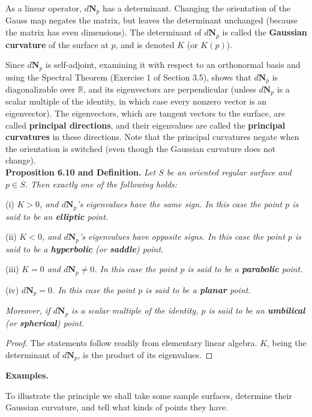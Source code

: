 \documentclass[leqno]{book}
\begin{document}
\noindent As a linear operator, $d\mathbf N_p$ has a determinant.  Changing the orientation of the Gauss map negates the matrix, but leaves the determinant unchanged (because the matrix has even dimensions).  The determinant of $d\mathbf N_p$ is called the \textbf{Gaussian curvature} of the surface at $p$, and is denoted $K$ (or $K(p)$).

Since $d\mathbf N_p$ is self-adjoint, examining it with respect to an orthonormal basis and using the Spectral Theorem (Exercise 1 of Section 3.5), shows that $d\mathbf N_p$ is diagonalizable over $\mathbb R$, and its eigenvectors are perpendicular (unless $d\mathbf N_p$ is a scalar multiple of the identity, in which case every nonzero vector is an eigenvector).  The eigenvectors, which are tangent vectors to the surface, are called \textbf{principal directions}, and their eigenvalues are called the \textbf{principal curvatures} in these directions.  Note that the principal curvatures negate when the orientation is switched (even though the Gaussian curvature does not change).\\

\noindent\textbf{Proposition 6.10 and Definition.} \emph{Let $S$ be an oriented regular surface and $p\in S$.  Then exactly one of the following holds:}

(i) \emph{$K>0$, and $d\mathbf N_p$'s eigenvalues have the same sign.  In this case the point $p$ is said to be an \textbf{elliptic} point.}

(ii) \emph{$K<0$, and $d\mathbf N_p$'s eigenvalues have opposite signs.  In this case the point $p$ is said to be a \textbf{hyperbolic} (or \textbf{saddle}) point.}

(iii) \emph{$K=0$ and $d\mathbf N_p\ne 0$.  In this case the point $p$ is said to be a \textbf{parabolic} point.}

(iv) \emph{$d\mathbf N_p=0$.  In this case the point $p$ is said to be a \textbf{planar} point.}

\emph{Moreover, if $d\mathbf N_p$ is a scalar multiple of the identity, $p$ is said to be an \textbf{umbilical} (or \textbf{spherical}) point.}
\begin{proof}
The statements follow readily from elementary linear algebra.  $K$, being the determinant of $d\mathbf N_p$, is the product of its eigenvalues.
\end{proof}

\noindent\textbf{Examples.}

To illustrate the principle we shall take some sample surfaces, determine their Gaussian curvature, and tell what kinds of points they have.
\end{document}
